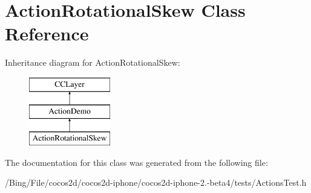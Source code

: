 \hypertarget{interface_action_rotational_skew}{\section{Action\-Rotational\-Skew Class Reference}
\label{interface_action_rotational_skew}
}
Inheritance diagram for Action\-Rotational\-Skew\-:\begin{figure}[H]
\begin{center}
\leavevmode
\includegraphics[height=3.000000cm]{interface_action_rotational_skew}
\end{center}
\end{figure}


The documentation for this class was generated from the following file\-:\begin{DoxyCompactItemize}
\item 
/\-Bing/\-File/cocos2d/cocos2d-\/iphone/cocos2d-\/iphone-\/2.-\/beta4/tests/Actions\-Test.\-h\end{DoxyCompactItemize}
